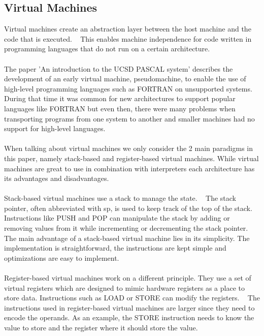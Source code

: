 \documentclass{article}
\begin{document}
\subsection{Virtual Machines}
Virtual machines create an abstraction layer between the host machine and the
code that is executed. ~\cite{fang2016} This enables machine independence for
code written in programming languages that do not run on a certain
architecture.
\\\\
The paper 'An introduction to the UCSD PASCAL system' describes the development
of an early virtual machine, pseudomachine, to enable the use of high-level
programming languages such as FORTRAN on unsupported systems. During that time
it was common for new architectures to support popular languages like FORTRAN
but even then, there were many problems when transporting programs from one
system to another and smaller machines had no support for high-level languages.
~\cite{pascal}
\\\\
When talking about virtual machines we only consider the 2 main paradigms in
this paper, namely stack-based and register-based virtual machines. While
virtual machines are great to use in combination with interpreters each
architecture has its advantages and disadvantages.
\\\\
Stack-based virtual machines use a stack to manage the state. ~\cite{fang2016}
The stack pointer, often abbreviated with sp, is used to keep track of the top
of the stack. Instructions like PUSH and POP can manipulate the stack by adding
or removing values from it while incrementing or decrementing the stack
pointer. The main advantage of a stack-based virtual machine lies in its
simplicity. The implementation is straightforward, the instructions are kept
simple and optimizations are easy to implement. ~\cite{fang2016}
\\\\
Register-based virtual machines work on a different principle. They use a set
of virtual registers which are designed to mimic hardware registers as a place
to store data. Instructions such as LOAD or STORE can modify the registers.
~\cite{fang2016} The instructions used in register-based virtual machines are
larger since they need to encode the operands. As an example, the STORE
instruction needs to know the value to store and the register where it should
store the value. ~\cite{fang2016}
\\\\
\end{document}
